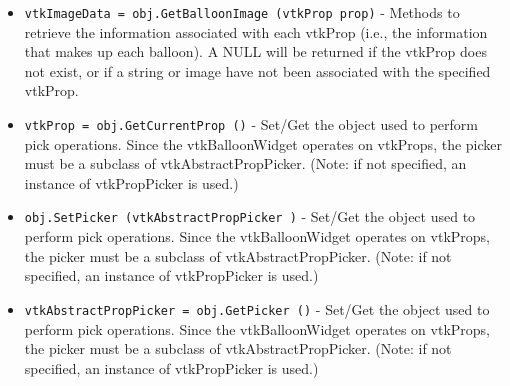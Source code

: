 \begin{itemize}
\item  \verb|vtkImageData = obj.GetBalloonImage (vtkProp prop)| -  Methods to retrieve the information associated with each vtkProp (i.e.,
 the information that makes up each balloon). A NULL will be returned if
 the vtkProp does not exist, or if a string or image have not been
 associated with the specified vtkProp.

\item  \verb|vtkProp = obj.GetCurrentProp ()| -  Set/Get the object used to perform pick operations. Since the
 vtkBalloonWidget operates on vtkProps, the picker must be a subclass of
 vtkAbstractPropPicker. (Note: if not specified, an instance of
 vtkPropPicker is used.)

\item  \verb|obj.SetPicker (vtkAbstractPropPicker )| -  Set/Get the object used to perform pick operations. Since the
 vtkBalloonWidget operates on vtkProps, the picker must be a subclass of
 vtkAbstractPropPicker. (Note: if not specified, an instance of
 vtkPropPicker is used.)

\item  \verb|vtkAbstractPropPicker = obj.GetPicker ()| -  Set/Get the object used to perform pick operations. Since the
 vtkBalloonWidget operates on vtkProps, the picker must be a subclass of
 vtkAbstractPropPicker. (Note: if not specified, an instance of
 vtkPropPicker is used.)

\end{itemize}
